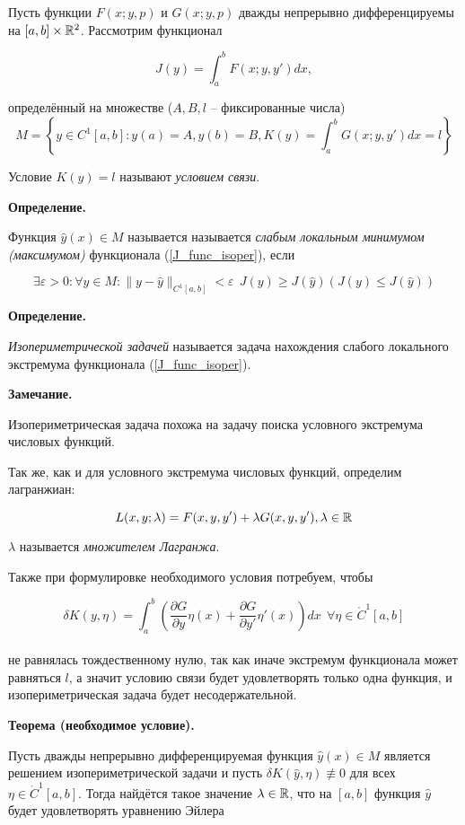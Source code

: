 Пусть функции $F(x; y, p)$ и $G(x; y, p)$ дважды непрерывно
дифференцируемы на $[a, b] \times \mathbb{R}^2$. Рассмотрим функционал

\begin{equation}\label{J_func_isoper}
J(y) = \int_a^b F(x; y, y') dx,
\end{equation}

определённый на множестве ($A, B, l$ -- фиксированные числа)
$$
M = \left\{ y \in C^1 [a, b] : y(a) = A, y(b) = B, 
K(y) = \int_a^b G(x; y, y') dx = l \right\}
$$

Условие $K(y) = l$ называют \textit{условием связи}.

\textbf{Определение.}

Функция $\widehat{y}(x) \in M$ называется называется 
\textit{слабым локальным минимумом (максимумом)} функционала 
(\ref{J_func_isoper}), если 

$$
\exists \varepsilon > 0 : \forall y \in M : 
\| y - \widehat{y} \|_{C^1 [a, b]} < \varepsilon \ \ 
J(y) \geqslant J(\widehat{y}) 
\left( J(y) \leqslant J(\widehat{y}) \right)
$$

\textbf{Определение.}

\textit{Изопериметрической задачей} называется задача нахождения
слабого локального экстремума функционала (\ref{J_func_isoper}).

\textbf{Замечание.}

Изопериметрическая задача похожа на задачу поиска
условного экстремума числовых функций.

Так же, как и для условного экстремума числовых функций,
определим лагранжиан:

$$
L(x, y; \lambda) = F(x, y, y') + \lambda G(x, y, y'), \lambda \in \mathbb{R}
$$

$\lambda$ называется \textit{множителем Лагранжа}.

Также при формулировке необходимого условия потребуем, чтобы 

$$
\delta K(y, \eta) = \int_a^b \left(
\frac{\partial G}{\partial y} \eta(x) + 
\frac{\partial G}{\partial y'} \eta'(x)
\right) dx \ \ \forall \eta \in \mathring{C}^1 [a, b]
$$
\\
не равнялась тождественному нулю, так как иначе 
экстремум функционала может равняться $l$, а значит
условию связи будет удовлетворять только одна функция, и 
изопериметрическая задача будет несодержательной.

\textbf{Теорема (необходимое условие).}

Пусть дважды непрерывно дифференцируемая функция $\widehat{y}(x) \in M$
является решением изопериметрической задачи и пусть
$\delta K (\widehat{y}, \eta) \not \equiv 0$ для всех 
$\eta \in \mathring{C}^1 [a, b]$.
Тогда найдётся такое значение $\lambda \in \mathbb{R}$, что на $[a, b]$
функция $\widehat{y}$ будет удовлетворять уравнению Эйлера

